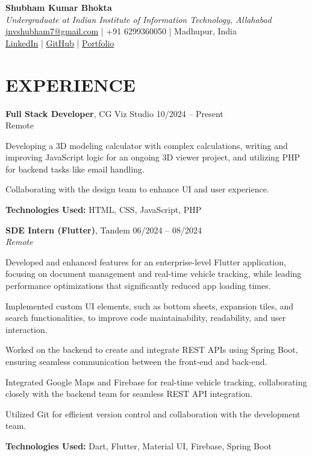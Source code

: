 \documentclass[10pt, letterpaper]{article}
\begin{document}
\begin{center}
    \textbf{\huge Shubham Kumar Bhokta} \\[0.5em]
    \textit{Undergraduate at Indian Institute of Information Technology, Allahabad} \\[0.5em]
    \href{mailto:jnvshubham7@gmail.com}{jnvshubham7@gmail.com} | 
    +91 6299360050 | 
    Madhupur, India \\
    \href{https://linkedin.com/in/shubham-kumar-bhokta-97113116b}{LinkedIn} | 
    \href{https://github.com/jnvshubham7}{GitHub} | 
    \href{https://shubhambhokta.vercel.app/}{Portfolio}
\end{center}

\section{EXPERIENCE}

\textbf{Full Stack Developer}, CG Viz Studio \hfill 10/2024 -- Present \\
Remote
\begin{highlightsforbulletentries}
    \item Developing a 3D modeling calculator with complex calculations, writing and improving JavaScript logic for an ongoing 3D viewer project, and utilizing PHP for backend tasks like email handling.
    \item Collaborating with the design team to enhance UI and user experience.
\end{highlightsforbulletentries}
\item 
\textbf{Technologies Used:} HTML, CSS, JavaScript, PHP

\vspace{1em}

\textbf{SDE Intern (Flutter)}, Tandem \hfill 06/2024 -- 08/2024 \\
\textit{Remote} \\
\begin{highlightsforbulletentries}
    \item Developed and enhanced features for an enterprise-level Flutter application, focusing on document management and real-time vehicle tracking, while leading performance optimizations that significantly reduced app loading times.
    \item Implemented custom UI elements, such as bottom sheets, expansion tiles, and search functionalities, to improve code maintainability, readability, and user interaction.
    \item Worked on the backend to create and integrate REST APIs using Spring Boot, ensuring seamless communication between the front-end and back-end.
    \item Integrated Google Maps and Firebase for real-time vehicle tracking, collaborating closely with the backend team for seamless REST API integration.
    \item Utilized Git for efficient version control and collaboration with the development team.
\end{highlightsforbulletentries}
\textbf{Technologies Used:} Dart, Flutter, Material UI, Firebase, Spring Boot
\end{document}
